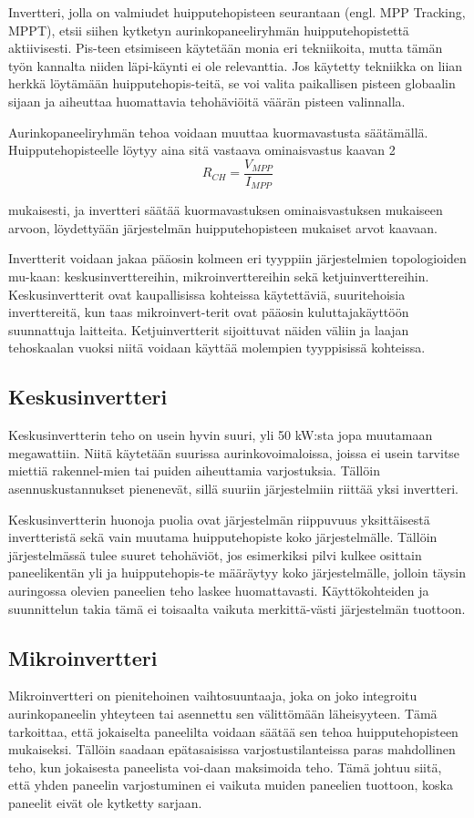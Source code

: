   Invertteri, jolla on valmiudet huipputehopisteen seurantaan (engl. MPP Tracking, MPPT), etsii siihen kytketyn aurinkopaneeliryhmän huipputehopistettä aktiivisesti. Pis-teen etsimiseen käytetään monia eri tekniikoita, mutta tämän työn kannalta niiden läpi-käynti ei ole relevanttia. Jos käytetty tekniikka on liian herkkä löytämään huipputehopis-teitä, se voi valita paikallisen pisteen globaalin sijaan ja aiheuttaa huomattavia tehohäviöitä väärän pisteen valinnalla.

  Aurinkopaneeliryhmän tehoa voidaan muuttaa kuormavastusta säätämällä. Huipputehopisteelle löytyy aina sitä vastaava ominaisvastus kaavan 2
  \begin{equation}
    R_{CH} = \frac{V_{MPP}}{I_{MPP}}
  \end{equation}

  mukaisesti, ja invertteri säätää kuormavastuksen ominaisvastuksen mukaiseen arvoon, löydettyään järjestelmän huipputehopisteen mukaiset arvot kaavaan.

  Invertterit voidaan jakaa pääosin kolmeen eri tyyppiin järjestelmien topologioiden mu-kaan: keskusinverttereihin, mikroinverttereihin sekä ketjuinverttereihin. Keskusinvertterit ovat kaupallisissa kohteissa käytettäviä, suuritehoisia inverttereitä, kun taas mikroinvert-terit ovat pääosin kuluttajakäyttöön suunnattuja laitteita. Ketjuinvertterit sijoittuvat näiden väliin ja laajan tehoskaalan vuoksi niitä voidaan käyttää molempien tyyppisissä kohteissa.

\subsection{Keskusinvertteri}
  Keskusinvertterin teho on usein hyvin suuri, yli 50 kW:sta jopa muutamaan megawattiin. Niitä käytetään suurissa aurinkovoimaloissa, joissa ei usein tarvitse miettiä rakennel-mien tai puiden aiheuttamia varjostuksia. Tällöin asennuskustannukset pienenevät, sillä suuriin järjestelmiin riittää yksi invertteri. 

  Keskusinvertterin huonoja puolia ovat järjestelmän riippuvuus yksittäisestä invertteristä sekä vain muutama huipputehopiste koko järjestelmälle. Tällöin järjestelmässä tulee suuret tehohäviöt, jos esimerkiksi pilvi kulkee osittain paneelikentän yli ja huipputehopis-te määräytyy koko järjestelmälle, jolloin täysin auringossa olevien paneelien teho laskee huomattavasti. Käyttökohteiden ja suunnittelun takia tämä ei toisaalta vaikuta merkittä-västi järjestelmän tuottoon.

\subsection{Mikroinvertteri}
  Mikroinvertteri on pienitehoinen vaihtosuuntaaja, joka on joko integroitu aurinkopaneelin yhteyteen tai asennettu sen välittömään läheisyyteen. Tämä tarkoittaa, että jokaiselta paneelilta voidaan säätää sen tehoa huipputehopisteen mukaiseksi. Tällöin saadaan epätasaisissa varjostustilanteissa paras mahdollinen teho, kun jokaisesta paneelista voi-daan maksimoida teho. Tämä johtuu siitä, että yhden paneelin varjostuminen ei vaikuta muiden paneelien tuottoon, koska paneelit eivät ole kytketty sarjaan. 

